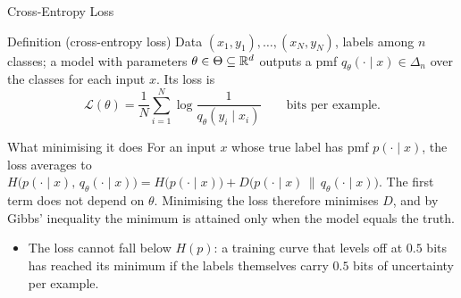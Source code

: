 \begin{frame}{Cross-Entropy Loss}
  \small
  \begin{block}{Definition (cross-entropy loss)}
    Data $(x_1,y_1),\dots,(x_N,y_N)$, labels among $n$ classes; a model with parameters $\theta\in\Theta\subseteq\mathbb{R}^d$ outputs a pmf $q_\theta(\cdot\mid x)\in\Delta_n$ over the classes for each input $x$. Its loss is
    \[
      \mathcal L(\theta)=\frac1N\sum_{i=1}^N\log\frac1{q_\theta(y_i\mid x_i)}\qquad\text{bits per example.}
    \]
  \end{block}
  \begin{block}{What minimising it does}
    For an input $x$ whose true label has pmf $p(\cdot\mid x)$, the loss averages to
    $H\big(p(\cdot\mid x),\,q_\theta(\cdot\mid x)\big)=H\big(p(\cdot\mid x)\big)+D\big(p(\cdot\mid x)\,\big\|\,q_\theta(\cdot\mid x)\big)$.
    The first term does not depend on $\theta$. Minimising the loss therefore minimises $D$, and by Gibbs' inequality the minimum is attained only when the model equals the truth.
  \end{block}
  \begin{itemize}
    \item The loss cannot fall below $H(p)$: a training curve that levels off at $0.5$ bits has reached its minimum if the labels themselves carry $0.5$ bits of uncertainty per example.
  \end{itemize}
\end{frame}

